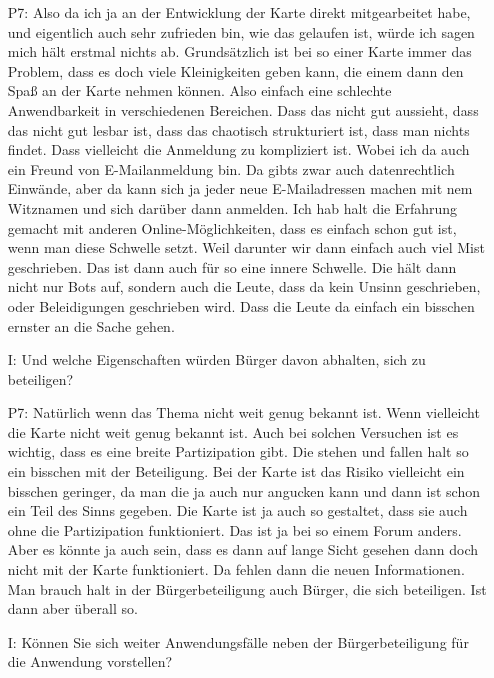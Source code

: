 \begin{itemize}
    \item[P7:] Also da ich ja an der Entwicklung der Karte direkt mitgearbeitet habe, und eigentlich auch sehr zufrieden bin, wie das gelaufen ist, w{\"u}rde ich sagen mich h{\"a}lt erstmal nichts ab. Grunds{\"a}tzlich ist bei so einer Karte immer das Problem, dass es doch viele Kleinigkeiten geben kann, die einem dann den Spa{\ss} an der Karte nehmen k{\"o}nnen. Also einfach eine schlechte Anwendbarkeit in verschiedenen Bereichen. Dass das nicht gut aussieht, dass das nicht gut lesbar ist, dass das chaotisch strukturiert ist, dass man nichts findet. Dass vielleicht die Anmeldung zu kompliziert ist. Wobei ich da auch ein Freund von E-Mailanmeldung bin. Da gibts zwar auch datenrechtlich Einw{\"a}nde, aber da kann sich ja jeder neue E-Mailadressen machen mit nem Witznamen und sich dar{\"u}ber dann anmelden. Ich hab halt die Erfahrung gemacht mit anderen Online-M{\"o}glichkeiten, dass es einfach schon gut ist, wenn man diese Schwelle setzt. Weil darunter wir dann einfach auch viel Mist geschrieben. Das ist dann auch f{\"u}r so eine innere Schwelle. Die h{\"a}lt dann nicht nur Bots auf, sondern auch die Leute, dass da kein Unsinn geschrieben, oder Beleidigungen geschrieben wird. Dass die Leute da einfach ein bisschen ernster an die Sache gehen.
    \item[I:] Und welche Eigenschaften w{\"u}rden B{\"u}rger davon abhalten, sich zu beteiligen?
    \item[P7:] Nat{\"u}rlich wenn das Thema nicht weit genug bekannt ist. Wenn vielleicht die Karte nicht weit genug bekannt ist. Auch bei solchen Versuchen ist es wichtig, dass es eine breite Partizipation gibt. Die stehen und fallen halt so ein bisschen mit der Beteiligung. Bei der Karte ist das Risiko vielleicht ein bisschen geringer, da man die ja auch nur angucken kann und dann ist schon ein Teil des Sinns gegeben. Die Karte ist ja auch so gestaltet, dass sie auch ohne die Partizipation funktioniert. Das ist ja bei so einem Forum anders. Aber es könnte ja auch sein, dass es dann auf lange Sicht gesehen dann doch nicht mit der Karte funktioniert. Da fehlen dann die neuen Informationen. Man brauch halt in der B{\"u}rgerbeteiligung auch B{\"u}rger, die sich beteiligen. Ist dann aber {\"u}berall so.
    \item[I:] K{\"o}nnen Sie sich weiter Anwendungsf{\"a}lle neben der B{\"u}rgerbeteiligung f{\"u}r die Anwendung vorstellen?

\end{itemize}
